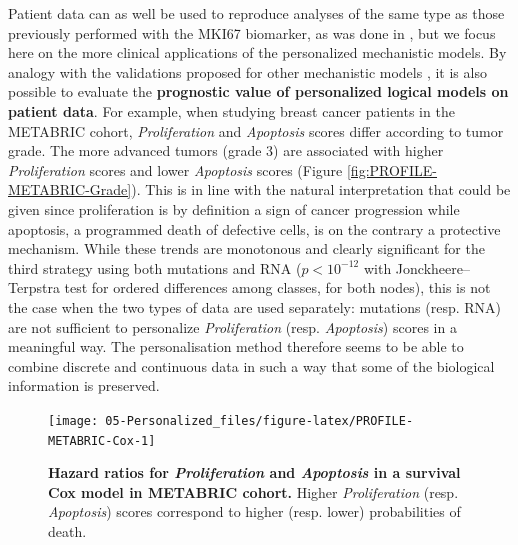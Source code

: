 \documentclass[a4paper,12pt,twoside,onecolumn,openright,final,oldfontcommands]{memoir}
\begin{document}
Patient data can as well be used to reproduce analyses of the same type
as those previously performed with the MKI67 biomarker, as was done in
\citet{beal2019personalization}, but we focus here on the more clinical
applications of the personalized mechanistic models. By analogy with the
validations proposed for other mechanistic models
\citep{fey2015signaling}, it is also possible to evaluate the
\textbf{prognostic value of personalized logical models on patient
data}. For example, when studying breast cancer patients in the METABRIC
cohort, \emph{Proliferation} and \emph{Apoptosis} scores differ
according to tumor grade. The more advanced tumors (grade 3) are
associated with higher \emph{Proliferation} scores and lower
\emph{Apoptosis} scores (Figure \ref{fig:PROFILE-METABRIC-Grade}). This
is in line with the natural interpretation that could be given since
proliferation is by definition a sign of cancer progression while
apoptosis, a programmed death of defective cells, is on the contrary a
protective mechanism. While these trends are monotonous and clearly
significant for the third strategy using both mutations and RNA
(\(p<10^{-12}\) with Jonckheere--Terpstra test for ordered differences
among classes, for both nodes), this is not the case when the two types
of data are used separately: mutations (resp. RNA) are not sufficient to
personalize \emph{Proliferation} (resp. \emph{Apoptosis}) scores in a
meaningful way. The personalisation method therefore seems to be able to
combine discrete and continuous data in such a way that some of the
biological information is preserved.

\begin{figure}

{\centering \texttt{[image: 05-Personalized\_files/figure-latex/PROFILE-METABRIC-Cox-1]} 

}

\caption[Hazard ratios for *Proliferation* and *Apoptosis* in a survival Cox model in METABRIC cohort]{\textbf{Hazard ratios for
\emph{Proliferation} and \emph{Apoptosis} in a survival Cox model in
METABRIC cohort.} Higher \emph{Proliferation} (resp. \emph{Apoptosis})
scores correspond to higher (resp. lower) probabilities of death.}\label{fig:PROFILE-METABRIC-Cox}
\end{figure}
\end{document}
